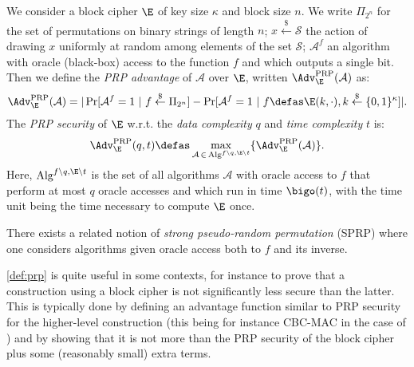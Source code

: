 \begin{defi}
We consider a block cipher $\E$ of key size $\kappa$ and block size $n$.
We write $\Pi_{2^n}$ for the set of permutations on binary strings of length $n$; $x \overset{\$}{\leftarrow} \mathcal{S}$
the action of drawing $x$ uniformly at random among elements of the set $\mathcal{S}$; $\mathcal{A}^{f}$ an algorithm with
oracle (black-box) access to the function $f$ and which outputs a single bit.
Then we define the \emph{PRP advantage} of $\mathcal{A}$ over $\E$, written $\Adv^{\text{PRP}}_{\E}(\mathcal{A})$ as:
\[
\Adv^{\text{PRP}}_{\E}(\mathcal{A}) = |\Pr[\mathcal{A}^f = 1~|~f \overset{\$}{\leftarrow} \Pi_{2^n}] - \Pr[\mathcal{A}^f = 1~|~f \defas \E(k,\cdot), k \overset{\$}{\leftarrow} \{0,1\}^\kappa]|.
\]
The \emph{PRP security} of $\E$ w.r.t. the \emph{data complexity} $q$ and \emph{time complexity} $t$ is:
\[
\Adv^{\text{PRP}}_{\E}(q,t) \defas \max_{\mathcal{A}\,\in\,\text{Alg}^{f\backslash q, \E\backslash t}} \{\Adv^{\text{PRP}}_{\E}(\mathcal{A})\}.
\]
Here, $\text{Alg}^{f\backslash q, \E\backslash t}$ is the set of all algorithms $\mathcal{A}$ with oracle access to $f$ that perform at most $q$ oracle accesses
and which run in time $\bigo(t)$, with the time unit being the time necessary to compute $\E$ once.
\label{def:prp}
\end{defi}
There exists a related notion of \emph{strong pseudo-random permutation} (SPRP) where one considers algorithms given oracle access both to $f$ and its inverse.

\medskip

\autoref{def:prp} is quite useful in some contexts, for instance to prove that a construction using a block cipher is not significantly less secure than the latter. This is
typically done by defining an advantage function similar to PRP security for the higher-level construction (this being for instance CBC-MAC in the case of \cite{DBLP:journals/jcss/BellareKR00}) and by showing that
it is not more than the PRP security of the block cipher plus some (reasonably small) extra terms.


